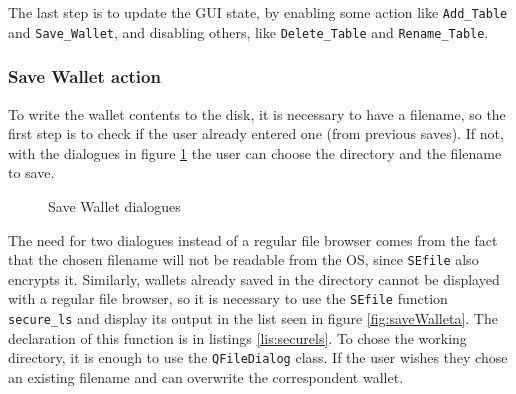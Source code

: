 The last step is to update the GUI state, by enabling some action like \texttt{Add\_Table} and \texttt{Save\_Wallet}, and disabling others, like \texttt{Delete\_Table} and \texttt{Rename\_Table}.

\subsubsection*{Save Wallet action} \label{sec:savewalletaction}
To write the wallet contents to the disk, it is necessary to have a filename, so the first step is to check if the user already entered one (from previous saves). If not, with the dialogues in figure \ref{fig:saveWallet} the user can choose the directory and the filename to save.

\begin{figure}[ht]
  \centering
  {}
  \caption{Save Wallet dialogues}
 \label{fig:saveWallet}
\end{figure}

The need for two dialogues instead of a regular file browser comes from the fact that the chosen filename will not be readable from the OS, since \texttt{SEfile} also encrypts it. Similarly, wallets already saved in the directory cannot be displayed with a regular file browser, so it is necessary to use the \texttt{SEfile} function \texttt{secure\_ls} and display its output in the list seen in figure \ref{fig:saveWalleta}. The declaration of this function is in listings \ref{lis:securels}. To chose the working directory, it is enough to use the \texttt{QFileDialog} class. If the user wishes they chose an existing filename and can overwrite the correspondent wallet.

